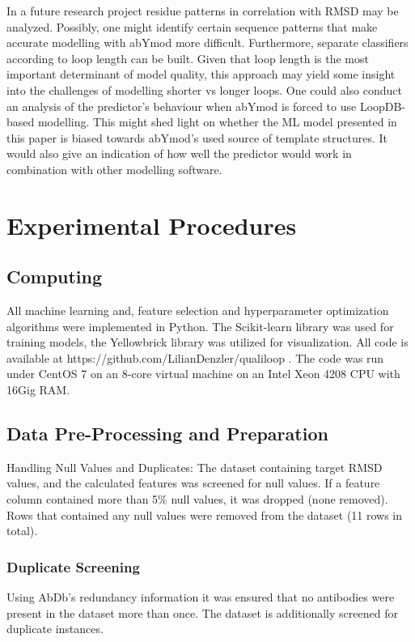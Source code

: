 \documentclass[preprint,12pt]{elsarticle}
\begin{document}
 In a future research project residue patterns in correlation with RMSD may be analyzed. Possibly, one might identify certain sequence patterns that make accurate modelling with abYmod more difficult. Furthermore, separate classifiers according to loop length can be built. Given that loop length is the most important determinant of model quality, this approach may yield some insight into the challenges of modelling shorter vs longer loops. 
One could also conduct an analysis of the predictor’s behaviour when abYmod is forced to use LoopDB-based modelling. This might shed light on whether the ML model presented in this paper is biased towards abYmod’s used source of template structures. It would also give an indication of how well the predictor would work in combination with other modelling software. 

 


\appendix{}
\section{Experimental Procedures}
\subsection{Computing}
All machine learning and, feature selection and hyperparameter optimization algorithms were implemented in Python. The Scikit-learn library was used for training models, the Yellowbrick\cite{Bengfort2021} library was utilized for visualization. All code is available at https://github.com/LilianDenzler/qualiloop . 
The code was run under CentOS 7 on an 8-core virtual machine on an Intel Xeon 4208 CPU with 16Gig RAM.

\subsection{Data Pre-Processing and Preparation}
Handling Null Values and Duplicates: The dataset containing target RMSD values, and the calculated features was screened for null values. If a feature column contained more than 5\% null values, it was dropped (none removed). Rows that contained any null values were removed from the dataset (11 rows in total). 

\subsubsection{Duplicate Screening} Using AbDb’s redundancy information it was ensured that no antibodies were present in the dataset more than once. The dataset is additionally screened for duplicate instances.
\end{document}
